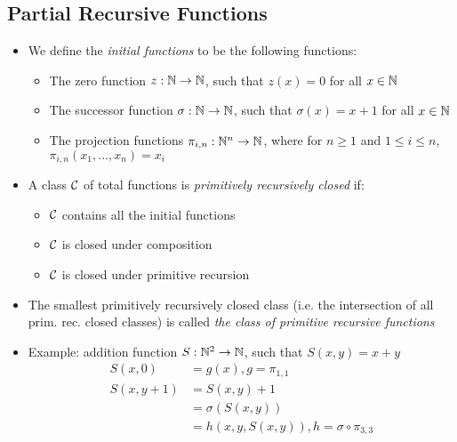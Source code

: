\begin{itemize}
\end{itemize}

\subsection{Partial Recursive Functions}

\begin{itemize}
	
	\item We define the \textit{initial functions} to be the following functions:
	
	\begin{itemize}
		
		\item The zero function $ z: \mathbb{N} \to \mathbb{N} $, such that $ z(x) = 0 $ for all $ x \in \mathbb{N} $
		
		\item The successor function $ \sigma: \mathbb{N} \to \mathbb{N} $, such that $ \sigma(x) = x + 1 $ for all $ x \in \mathbb{N} $
		
		\item The projection functions $ \pi_{i, n}: \mathbb{N}^n \to \mathbb{N} $, where for $ n \ge 1 $ and $ 1 \le i \le n $, $ \pi_{i, n}(x_1, \dots, x_n) = x_i $
		
	\end{itemize}

	\item A class $ \mathcal{C} $ of total functions is \textit{primitively recursively closed} if:
	
	\begin{itemize}
		
		\item $ \mathcal{C} $ contains all the initial functions
		
		\item $ \mathcal{C} $ is closed under composition
		
		\item $ \mathcal{C} $ is closed under primitive recursion
		
	\end{itemize}

	\item The smallest primitively recursively closed class (i.e. the intersection of all prim. rec. closed classes) is called \textit{the class of primitive recursive functions}
	
	\item Example: addition function $ S: \mathbb{N}^2 \to \mathbb{N} $, such that $ S(x, y) = x + y $
	\begin{align*}
	S(x, 0) &= g(x), g = \pi_{1, 1}\\
	S(x, y  + 1) &= S(x, y) + 1\\
				 &= \sigma(S(x, y))\\
				 &= h(x, y, S(x, y)), h = \sigma \circ \pi_{3, 3}
	\end{align*}
	
\end{itemize}
